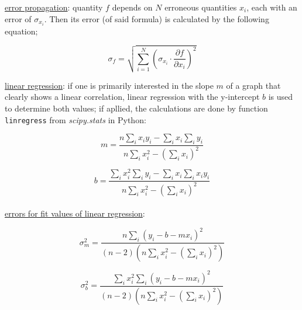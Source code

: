     \underline{error propagation}: quantity $f$ depends on $N$ erroneous quantities
    $x_i$, each with an error of $\sigma_{x_i}$. Then its error (of said
    formula) is calculated by the following equation;

    \begin{equation}
        \sigma_f = \sqrt{\sum_{i=1}^{N}\left(\sigma_{x_i} \cdot \frac{\partial f}{\partial x_i}\right)^2}
        \label{eq:gausserrprop}
    \end{equation}

\newpage

    \underline{linear regression}: if one is primarily interested in the slope
    $m$ of a graph that clearly shows a linear correlation, linear regression
    with the y-intercept $b$ is used to determine both values; if apllied, the
    calculations are done by function \texttt{linregress} from
    \textit{scipy.stats} in Python:

    \begin{equation}
        m = \frac{n \sum_i x_i y_i - \sum_i x_i \sum_i y_i}{n \sum_i x_i^2 - (\sum_i x_i)^2}
        \label{eq:m_linregress}
    \end{equation}

    \begin{equation}
        b = \frac{\sum_i x_i^2 \sum_i y_i - \sum_i x_i \sum_i x_i y_i}{n \sum_i x_i^2 - (\sum_i x_i)^2}
        \label{eq:b_linregress}
    \end{equation}
    \\

    \underline{errors for fit values of linear regression}:

    \begin{equation}
        \sigma_m^2 = \frac{n \sum_i (y_i - b - mx_i)^2}{(n-2)(n \sum_i x_i^2 - (\sum_i x_i)^2)}
        \label{eq:m_linregress_err}
    \end{equation}

    \begin{equation}
        \sigma_b^2 = \frac{\sum_i x_i^2 \sum_i (y_i - b - mx_i)^2}{(n-2)(n \sum_i x_i^2 -(\sum_i x_i)^2)}
        \label{eq:b_linregress_err}
    \end{equation}
